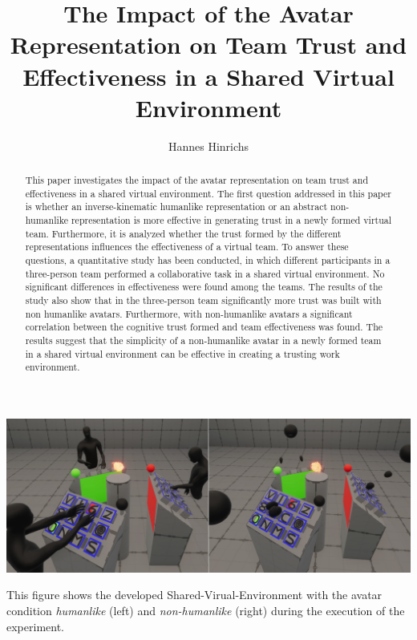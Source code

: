 \documentclass[sigchi]{acmart}
\begin{document}
\title{The Impact of the Avatar Representation on Team Trust and Effectiveness in a Shared Virtual Environment}

\author{Hannes Hinrichs}

\begin{abstract}
This paper investigates the impact of the avatar representation on team trust and effectiveness in a shared virtual environment. The first question addressed in this paper is whether an inverse-kinematic humanlike representation or an abstract non-humanlike representation is more effective in generating trust in a newly formed virtual team. Furthermore, it is analyzed whether the trust formed by the different representations influences the effectiveness of a virtual team. To answer these questions, a quantitative study has been conducted, in which different participants in a three-person team performed a collaborative task in a shared virtual environment. No significant differences in effectiveness were found among the teams. The results of the study also show that in the three-person team significantly more trust was built with non humanlike avatars. Furthermore, with non-humanlike avatars a significant correlation between the cognitive trust formed and team effectiveness was found. The results suggest that the simplicity of a non-humanlike avatar in a newly formed team in a shared virtual environment can be effective in creating a trusting work environment.
\end{abstract}


\begin{teaserfigure}
  \includegraphics[width=\textwidth]{Abbildungen/BannerImageTP}
  \caption{This figure shows the developed Shared-Virual-Environment with the avatar condition \textit{humanlike} (left) and \textit{non-humanlike} (right) during the execution of the experiment.}
  \label{fig:teaser}
\end{teaserfigure}
\end{document}
